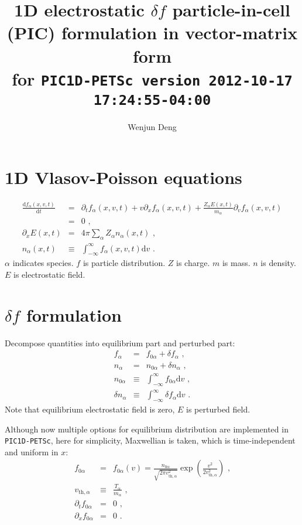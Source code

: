 \documentclass[12pt]{article}
\begin{document}
\newcommand{\md}{\mathrm{d}}
\newcommand{\me}{\mathrm{e}}

\title{1D electrostatic $\delta f$ particle-in-cell (PIC) formulation in vector-matrix form \\
\large for \texttt{PIC1D-PETSc version 2012-10-17 17:24:55-04:00}}
\author{Wenjun Deng}
\maketitle


\section{1D Vlasov-Poisson equations}

\begin{eqnarray}
	\frac{\md f_\alpha(x, v, t)}{\md t} & = & \partial_t f_\alpha(x, v, t) + v \partial_x f_\alpha(x, v, t) + \frac{Z_\alpha E(x, t)}{m_\alpha} \partial_v f_\alpha(x, v, t) \nonumber \\
	& = & 0 \textrm{ ,} \\
	\partial_x E(x, t) & = & 4 \pi \sum_\alpha Z_\alpha n_\alpha(x, t) \textrm{ ,} \\
	n_\alpha(x, t) & \equiv & \int_{-\infty}^{\infty} f_\alpha(x, v, t) \md v \textrm{ .}
\end{eqnarray}
$\alpha$ indicates species.
$f$ is particle distribution.
$Z$ is charge.
$m$ is mass.
$n$ is density.
$E$ is electrostatic field.


\section{$\delta f$ formulation}

Decompose quantities into equilibrium part and perturbed part:
\begin{eqnarray}
	f_\alpha & = & f_{0 \alpha} + \delta f_\alpha \textrm{ ,} \\
	n_\alpha & = & n_{0 \alpha} + \delta n_\alpha \textrm{ ,} \\
	n_{0 \alpha} & \equiv & \int_{-\infty}^{\infty} f_{0 \alpha} \md v \textrm{ ,} \\
	\delta n_{\alpha} & \equiv & \int_{-\infty}^{\infty} \delta f_{\alpha} \md v \textrm{ .}
\end{eqnarray}
Note that equilibrium electrostatic field is zero, $E$ is perturbed field.

Although now multiple options for equilibrium distribution are implemented in \texttt{PIC1D-PETSc}, here for simplicity, Maxwellian is taken, which is time-independent and uniform in $x$:
\begin{eqnarray}
	f_{0 \alpha} & = & f_{0 \alpha}(v) = \frac{n_{0 \alpha}}{\sqrt{2 \pi v_{\mathrm{th}, \alpha}^2}} \exp \left( \frac{v^2}{2 v_{\mathrm{th}, \alpha}^2} \right) \textrm{ ,} \\
	v_{\mathrm{th}, \alpha} & \equiv & \frac{T_\alpha}{m_\alpha} \textrm{ ,} \\
	\partial_t f_{0 \alpha} & = & 0 \textrm{ ,} \\
	\partial_x f_{0 \alpha} & = & 0 \textrm{ .}
\end{eqnarray}
\end{document}
